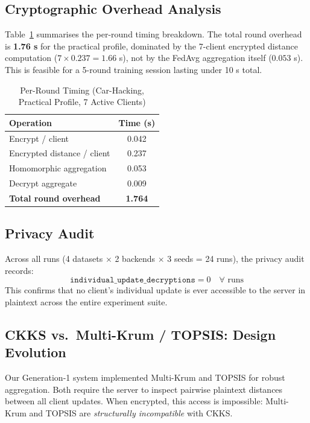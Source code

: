 \documentclass[conference]{IEEEtran}
\begin{document}
\subsection{Cryptographic Overhead Analysis}

Table~\ref{tab:overhead} summarises the per-round timing breakdown.
The total round overhead is \textbf{1.76 s} for the practical profile,
dominated by the 7-client encrypted distance computation ($7 \times 0.237
= 1.66$ s), not by the FedAvg aggregation itself ($0.053$ s). This is
feasible for a 5-round training session lasting under 10 s total.

\begin{table}[!t]
\centering
\caption{Per-Round Timing (Car-Hacking, Practical Profile, 7 Active Clients)}
\label{tab:overhead}
\begin{tabular}{@{}lc@{}}
\toprule
\textbf{Operation} & \textbf{Time (s)} \\
\midrule
Encrypt / client & 0.042 \\
Encrypted distance / client & 0.237 \\
Homomorphic aggregation & 0.053 \\
Decrypt aggregate & 0.009 \\
\textbf{Total round overhead} & \textbf{1.764} \\
\bottomrule
\end{tabular}
\end{table}

\subsection{Privacy Audit}

Across all runs (4 datasets $\times$ 2 backends $\times$ 3 seeds = 24 runs),
the privacy audit records:
\[
  \texttt{individual\_update\_decryptions} = 0 \quad \forall \text{ runs}
\]
This confirms that no client's individual update is ever accessible
to the server in plaintext across the entire experiment suite.

\subsection{CKKS vs.\ Multi-Krum / TOPSIS: Design Evolution}

Our Generation-1 system \cite{generation1report} implemented Multi-Krum
\cite{blanchard2017machine} and TOPSIS \cite{hwang1981topsis} for robust
aggregation. Both require the server to inspect pairwise plaintext distances
between all client updates. When encrypted, this access is impossible:
Multi-Krum and TOPSIS are \emph{structurally incompatible} with CKKS.
\end{document}
